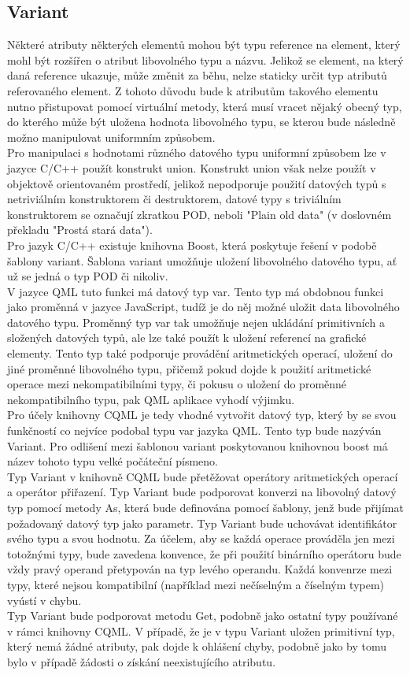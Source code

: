\documentclass[report,11pt]{elsarticle}
\begin{document}
\subsection {Variant}
Některé atributy některých elementů mohou být typu reference na element, který mohl být rozšířen o atribut libovolného typu a názvu. Jelikož se element, na který daná reference ukazuje, může změnit za běhu, nelze staticky určit typ atributů referovaného element. Z tohoto důvodu bude k atributům takového elementu nutno přistupovat pomocí virtuální metody, která musí vracet nějaký obecný typ, do kterého může být uložena hodnota libovolného typu, se kterou bude následně možno manipulovat uniformním způsobem.\\
Pro manipulaci s hodnotami různého datového typu uniformní způsobem lze v jazyce C/C++ použít konstrukt union. Konstrukt union však nelze použít v objektově orientovaném prostředí, jelikož nepodporuje použití datových typů s netriviálním konstruktorem či destruktorem, datové typy s triviálním konstruktorem se označují zkratkou POD, neboli "Plain old data" (v doslovném překladu "Prostá stará data").\\
Pro jazyk C/C++ existuje knihovna Boost, která poskytuje řešení v podobě šablony variant. Šablona variant umožňuje uložení libovolného datového typu, ať už se jedná o typ POD či nikoliv.\\
V jazyce QML tuto funkci má datový typ var. Tento typ má obdobnou funkci jako proměnná v jazyce JavaScript, tudíž je do něj možné uložit data libovolného datového typu. Proměnný typ var tak umožňuje nejen ukládání primitivních a složených datových typů, ale lze také použít k uložení referencí na grafické elementy. Tento typ také podporuje provádění aritmetických operací, uložení do jiné proměnné libovolného typu, přičemž pokud dojde k použití aritmetické operace mezi nekompatibilními typy, či pokusu o uložení do proměnné nekompatibilního typu, pak QML aplikace vyhodí výjimku.\\
Pro účely knihovny CQML je tedy vhodné vytvořit datový typ, který by se svou funkčností co nejvíce podobal typu var jazyka QML. Tento typ bude nazýván Variant. Pro odlišení mezi šablonou variant poskytovanou knihovnou boost má název tohoto typu velké počáteční písmeno.\\
Typ Variant v knihovně CQML bude přetěžovat operátory aritmetických operací a operátor přiřazení. Typ Variant bude podporovat konverzi na libovolný datový typ pomocí metody As, která bude definována pomocí šablony, jenž bude přijímat požadovaný datový typ jako parametr. Typ Variant bude uchovávat identifikátor svého typu a svou hodnotu. Za účelem, aby se každá operace prováděla jen mezi totožnými typy, bude zavedena konvence, že při použití binárního operátoru bude vždy pravý operand přetypován na typ levého operandu. Každá konvenrze mezi typy, které nejsou kompatibilní (například mezi nečíselným a číselným typem) vyústí v chybu.\\
Typ Variant bude podporovat metodu Get, podobně jako ostatní typy používané v rámci knihovny CQML. V případě, že je v typu Variant uložen primitivní typ, který nemá žádné atributy, pak dojde k ohlášení chyby, podobně jako by tomu bylo v případě žádosti o získání neexistujícího atributu.\\
\end{document}
